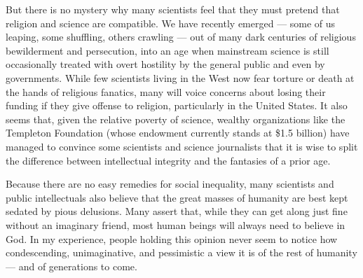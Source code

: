 \documentclass[a4paper,14pt]{extbook}
\begin{document}
But there is no mystery why many scientists feel that they must pretend that religion and science are compatible.
We have recently emerged --- some of us leaping, some shuffling, others crawling --- out of many dark centuries of religious bewilderment and persecution, into an age when mainstream science is still occasionally treated with overt hostility by the general public and even by governments.
While few scientists living in the West now fear torture or death at the hands of religious fanatics, many will voice concerns about losing their funding if they give offense to religion, particularly in the United States.
It also seems that, given the relative poverty of science, wealthy organizations like the Templeton Foundation (whose endowment currently stands at \$1.5 billion) have managed to convince some scientists and science journalists that it is wise to split the difference between intellectual integrity and the fantasies of a prior age.

Because there are no easy remedies for social inequality, many scientists and public intellectuals also believe that the great masses of humanity are best kept sedated by pious delusions.
Many assert that, while they can get along just fine without an imaginary friend, most human beings will always need to believe in God.
In my experience, people holding this opinion never seem to notice how condescending, unimaginative, and pessimistic a view it is of the rest of humanity --- and of generations to come.
\end{document}
